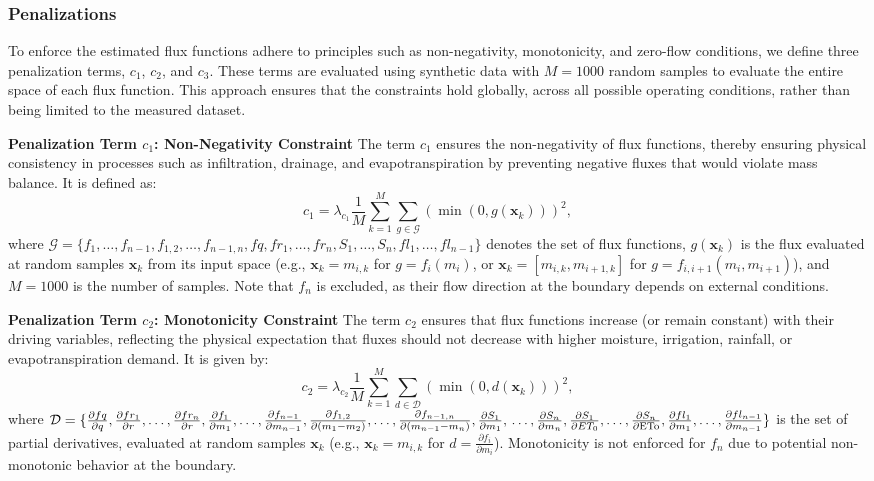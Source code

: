 \documentclass[pdflatex,sn-nature]{sn-jnl}%
\theoremstyle{thmstyleone}%
\theoremstyle{thmstyletwo}%
\theoremstyle{thmstylethree}%
\begin{document}



\subsubsection{Penalizations}
To enforce the estimated flux functions adhere to principles such as non-negativity, monotonicity, and zero-flow conditions, we define three penalization terms, \( c_1 \), \( c_2 \), and \( c_3 \). These terms are evaluated using synthetic data with \( M = 1000 \) random samples to evaluate the entire space of each flux function. This approach ensures that the constraints hold globally, across all possible operating conditions, rather than being limited to the measured dataset.

\textbf{Penalization Term \( c_1 \): Non-Negativity Constraint}
The term \( c_1 \) ensures the non-negativity of flux functions, thereby ensuring physical consistency in processes such as infiltration, drainage, and evapotranspiration by preventing negative fluxes that would violate mass balance. It is defined as:
\[
c_1 = \lambda_{c_1} \frac{1}{M} \sum_{k=1}^M \sum_{g \in \mathcal{G}} \left( \min(0, g(\mathbf{x}_k)) \right)^2,
\]
where \( \mathcal{G} = \{ f_1, \dots, f_{n-1}, f_{1,2}, \dots, f_{n-1,n}, fq, fr_1, \dots, fr_n, S_1, \dots, S_n, fl_1, \dots, fl_{n-1} \} \) denotes the set of flux functions, \( g(\mathbf{x}_k) \) is the flux evaluated at random samples \( \mathbf{x}_k \) from its input space (e.g., \( \mathbf{x}_k = m_{i,k} \) for \( g = f_i(m_i) \), or \( \mathbf{x}_k = [m_{i,k}, m_{i+1,k}] \) for \( g = f_{i,i+1}(m_i, m_{i+1}) \)), and \( M = 1000 \) is the number of samples. Note that \( f_n \) is excluded, as their flow direction at the boundary depends on external conditions.

\textbf{Penalization Term \( c_2 \): Monotonicity Constraint}
The term \( c_2 \) ensures that flux functions increase (or remain constant) with their driving variables, reflecting the physical expectation that fluxes should not decrease with higher moisture, irrigation, rainfall, or evapotranspiration demand. It is given by:
\[
c_2 = \lambda_{c_2} \frac{1}{M} \sum_{k=1}^M \sum_{d \in \mathcal{D}} \left( \min(0, d(\mathbf{x}_k)) \right)^2,
\]
where \( \mathcal{D} = \{ \frac{\partial fq}{\partial q}, \frac{\partial fr_1}{\partial r}, \dots, \frac{\partial fr_n}{\partial r}, \frac{\partial f_1}{\partial m_1}, \dots, \frac{\partial f_{n-1}}{\partial m_{n-1}}, \frac{\partial f_{1,2}}{\partial (m_1 - m_2)}, \dots, \frac{\partial f_{n-1,n}}{\partial (m_{n-1} - m_n)}, \frac{\partial S_1}{\partial m_1}, \\ 
\dots, \frac{\partial S_n}{\partial m_n}, \frac{\partial S_1}{\partial ET_0}, \dots, \frac{\partial S_n}{\partial \text{ETo}}, \frac{\partial fl_1}{\partial m_1}, \dots, \frac{\partial fl_{n-1}}{\partial m_{n-1}} \} \) is the set of partial derivatives, evaluated at random samples \( \mathbf{x}_k \) (e.g., \( \mathbf{x}_k = m_{i,k} \) for \( d = \frac{\partial f_i}{\partial m_i} \)). Monotonicity is not enforced for \( f_n \) due to potential non-monotonic behavior at the boundary.
\end{document}
